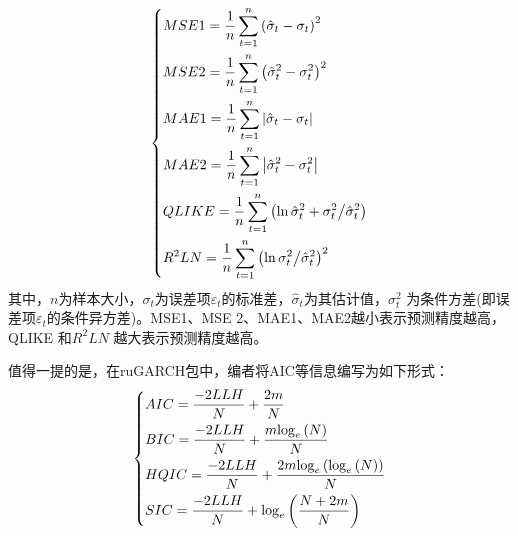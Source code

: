             \begin{equation*}
            \centering
            \left\{\begin{lgathered}
            MSE1 = \frac{1}{n}\sum\limits_{t = 1}^n {{{\left( {{{\hat \sigma }_t} - {\sigma _t}} \right)}^2}} \\
            MSE2 = \frac{1}{n}\sum\limits_{t = 1}^n {{{\left( {\hat \sigma _t^2 - \sigma _t^2} \right)}^2}} \\
            MAE1 = \frac{1}{n}\sum\limits_{t = 1}^n {\left| {{{\hat \sigma }_t} - {\sigma _t}} \right|} \\
            MAE2 = \frac{1}{n}\sum\limits_{t = 1}^n {\left| {\hat \sigma _t^2 - \sigma _t^2} \right|} \\
            QLIKE = \frac{1}{n}\sum\limits_{t = 1}^n {\left( {\ln \hat \sigma _t^2 + {{\sigma _t^2} \mathord{\left/
             {\vphantom {{\sigma _t^2} {\hat \sigma _t^2}}} \right.
             \kern-\nulldelimiterspace} {\hat \sigma _t^2}}} \right)} \\
            {R^2}LN = \frac{1}{n}\sum\limits_{t = 1}^n {{{\left( {\ln {{\sigma _t^2} \mathord{\left/
             {\vphantom {{\sigma _t^2} {\hat \sigma _t^2}}} \right.
             \kern-\nulldelimiterspace} {\hat \sigma _t^2}}} \right)}^2}}
             \end{lgathered} \right.
             \end{equation*}
            其中，$n$为样本大小，$\sigma_t$为误差项$\varepsilon_t$的标准差，$\hat{\sigma}_t$为其估计值，$\sigma_t^2$ 为条件方差(即误差项$\varepsilon_t$的条件异方差)。MSE1、MSE 2、MAE1、MAE2越小表示预测精度越高，QLIKE 和$R^2LN$ 越大表示预测精度越高。
            \par
            值得一提的是，在ruGARCH包中，编者将AIC等信息编写为如下形式：
            \begin{equation*}
            \centering
            \left\{\begin{lgathered}
            AIC = \frac{{ - 2LLH}}{N} + \frac{{2m}}{N}\\
            BIC = \frac{{ - 2LLH}}{N} + \frac{{m{{\log }_e}\left( N \right)}}{N}\\
            HQIC = \frac{{ - 2LLH}}{N} + \frac{{2m{{\log }_e}\left( {{{\log }_e}\left( N \right)} \right)}}{N}\\
            SIC = \frac{{ - 2LLH}}{N} + {\log _e}\left( {\frac{{N + 2m}}{N}} \right)
             \end{lgathered} \right.
             \end{equation*}
